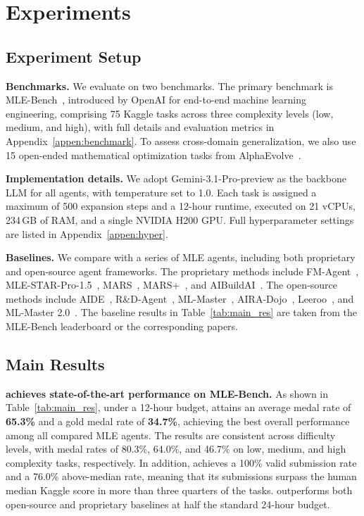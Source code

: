 
\section{Experiments}
\label{sec:experiments}


\subsection{Experiment Setup}
\label{sec:setup}

\textbf{Benchmarks.} We evaluate \sname on two benchmarks. The primary benchmark is MLE-Bench~\citep{mle-bench}, introduced by OpenAI for end-to-end machine learning engineering, comprising 75 Kaggle tasks across three complexity levels (low, medium, and high), with full details and evaluation metrics in Appendix~\ref{appen:benchmark}. To assess cross-domain generalization, we also use 15 open-ended mathematical optimization tasks from AlphaEvolve~\citep{novikov2025alphaevolve}.

\textbf{Implementation details.} We adopt Gemini-3.1-Pro-preview as the backbone LLM for all agents, with temperature set to 1.0. Each task is assigned a maximum of 500 expansion steps and a 12-hour runtime, executed on 21 vCPUs, 234\,GB of RAM, and a single NVIDIA H200 GPU. Full hyperparameter settings are listed in Appendix~\ref{appen:hyper}.

\textbf{Baselines.} We compare \sname with a series of MLE agents, including both proprietary and open-source agent frameworks. The proprietary methods include FM-Agent~\citep{li2025fm}, MLE-STAR-Pro-1.5~\citep{mle-star}, MARS~\citep{chen2026mars}, MARS+~\citep{chen2026mars}, and AIBuildAI~\citep{zhang2026aibuildai}. The open-source methods include AIDE~\citep{aide}, R\&D-Agent~\citep{rdagent}, ML-Master~\citep{ml-master}, AIRA-Dojo~\citep{dojo}, Leeroo~\citep{nadafian2026kapso}, and ML-Master 2.0~\citep{zhu2026mlmaster2}. The baseline results in Table~\ref{tab:main_res} are taken from the MLE-Bench leaderboard or the corresponding papers.

\subsection{Main Results}
\label{sec:main_results}



\noindent\textbf{\sname achieves state-of-the-art performance on MLE-Bench.} As shown in Table~\ref{tab:main_res}, under a 12-hour budget, \sname attains an average medal rate of \textbf{65.3\%} and a gold medal rate of \textbf{34.7\%}, achieving the best overall performance among all compared MLE agents. The results are consistent across difficulty levels, with medal rates of 80.3\%, 64.0\%, and 46.7\% on low, medium, and high complexity tasks, respectively. In addition, \sname achieves a 100\% valid submission rate and a 76.0\% above-median rate, meaning that its submissions surpass the human median Kaggle score in more than three quarters of the tasks. \sname outperforms both open-source and proprietary baselines at half the standard 24-hour budget.

